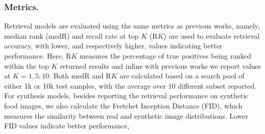 \documentclass[sigconf,nonacm]{acmart}
\begin{document}
\subsubsection*{\textbf{Metrics.}} Retrieval models are evaluated using the same metrics as previous works, namely, median rank (medR) and recall rate at top $K$ (R$K$) are used to evaluate retrieval accuracy, with lower, and respectively higher, values indicating better performance. Here, R$K$ measures the percentage of true positives being ranked within the top $K$ returned results and inline with previous works we report values at $K=1,5,10$. Both medR and R$K$ are calculated based on a search pool of either 1k or 10k test samples, with the average over 10 different subset reported. For synthesis models, besides reporting the retrieval performance on synthetic food images, we also calculate the Fretchet Inception Distance (FID), which measures the similarity between real and synthetic image distributions. Lower FID values indicate better performance,
\end{document}
